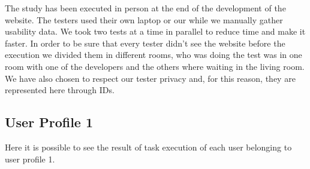 The study has been executed in person at the end of the development of the website. The testers used their own laptop or our while we manually gather usability data. We took two tests at a time in parallel to reduce time and make it faster. In order to be sure that every tester didn't see the website before the execution we divided them in different rooms, who was doing the test was in one room with one of the developers and the others where waiting in the living room.\\ We have also chosen to respect our tester privacy and, for this reason, they are represented here through IDs.

\subsection{User Profile 1}
Here it is possible to see the result of task execution of each user belonging to user profile 1.
